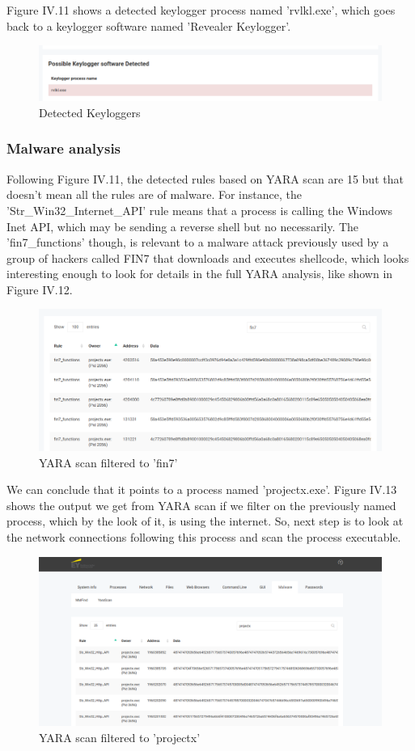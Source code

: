 Figure IV.11 shows a detected keylogger process named 'rvlkl.exe', which goes back to a keylogger software named 'Revealer Keylogger'.
\begin{figure}[H]
\centering
\includegraphics[width=0.9\columnwidth]{Figures/11.png}
\caption{Detected Keyloggers}
\end{figure}
\subsubsection{Malware analysis}
Following Figure IV.11, the detected rules based on YARA scan are 15 but that doesn't mean all the rules are of malware. For instance, the 'Str\_Win32\_Internet\_API' rule means that a process is calling the Windows Inet API, which may be sending a reverse shell but no necessarily. The 'fin7\_functions' though, is relevant to a malware attack previously used by a group of hackers called FIN7 that downloads and executes shellcode, which looks interesting enough to look for details in the full YARA analysis, like shown in Figure IV.12.
\begin{figure}[H]
\centering
\includegraphics[width=0.9\columnwidth]{Figures/12.png}
\caption{YARA scan filtered to 'fin7'}
\end{figure}
We can conclude that it points to a process named 'projectx.exe'. Figure IV.13 shows the output we get from YARA scan if we filter on the previously named process, which by the look of it, is using the internet. So, next step is to look at the network connections following this process and scan the process executable.
\begin{figure}[H]
\centering
\includegraphics[width=0.9\columnwidth]{Figures/13.png}
\caption{YARA scan filtered to 'projectx'}
\end{figure}
